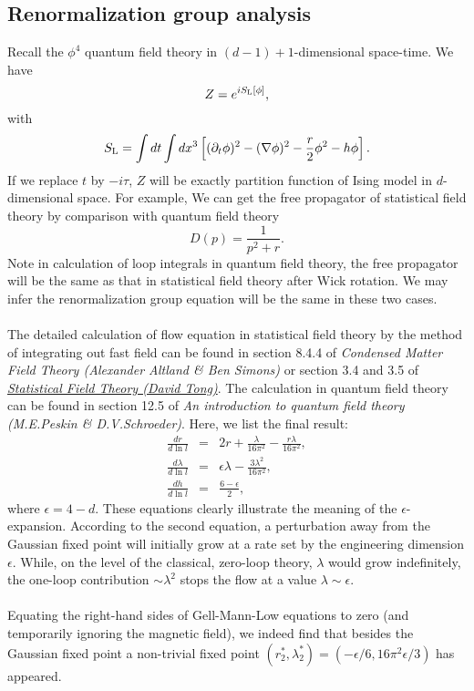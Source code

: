 \subsection{Renormalization group analysis}
Recall the  $\phi^4$ quantum field theory in $(d-1) + 1$-dimensional space-time. We have
\[Z = e^{iS_{\rm L}[\phi]},\]
with
\[S_{\rm L} = \int dt \int dx^3 \left[(\partial_t \phi)^2 - (\nabla \phi)^2 - \frac{r}{2}\phi^2 -h \phi \right].\]
If we replace $t$ by $-i\tau$, $Z$ will be exactly partition function of Ising model in $d$-dimensional space. For example, We can get the free propagator of statistical field theory by comparison with quantum field theory
\[D(p) = \frac{1}{p^2+r}.\]
Note in calculation of loop integrals in quantum field theory, the free propagator will be the same as that in statistical field theory after Wick rotation. We may infer the renormalization group equation will be the same in these two cases. 
\\ \\
The detailed calculation of flow equation in statistical field theory by the method of integrating out fast field can be found in section 8.4.4 of \emph{Condensed Matter Field Theory (Alexander Altland \& Ben Simons)} or section 3.4 and 3.5 of \href{http://www.damtp.cam.ac.uk/user/tong/sft.html}{\emph{Statistical Field Theory (David Tong)}}.
The calculation in quantum field theory can be found in section 12.5 of \emph{An introduction to quantum field theory (M.E.Peskin \& D.V.Schroeder)}. 
Here, we list the final result:
\begin{eqnarray}
\frac{dr}{d\ln l} &=& 2r + \frac{\lambda}{16 \pi^2} - \frac{r\lambda}{16\pi^2} ,\nonumber \\
\frac{d\lambda}{d\ln l} &=& \epsilon \lambda - \frac{3\lambda^2}{16\pi^2} ,\nonumber \\
\frac{dh}{d\ln l} &=& \frac{6 - \epsilon}{2} ,\nonumber
\end{eqnarray}
where $\epsilon = 4-d$.
These equations clearly illustrate the meaning of the $\epsilon$-expansion. According to the second equation, a perturbation away from the Gaussian fixed point will initially grow at a rate set by the engineering dimension $\epsilon$. While, on the level of the classical, zero-loop theory, $\lambda$ would grow indefinitely, the one-loop contribution $\sim \lambda^2$ stops the flow at a value $\lambda \sim \epsilon$.
\\ \\
Equating the right-hand sides of Gell-Mann-Low equations to zero (and temporarily ignoring the magnetic field), we indeed find that besides the Gaussian fixed point a non-trivial fixed point $(r_2^*, \lambda_2^*) = (-{\epsilon}/{6},{16\pi^2\epsilon}/{3})$ has appeared.
